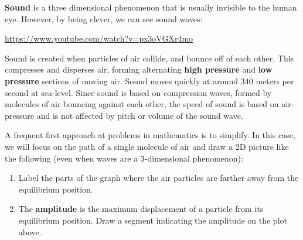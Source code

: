 \documentclass[12pt,noauthor,nooutcomes,hints,handout]{ximera}
\begin{document}
\textbf{Sound} is a three dimensional phenomenon that is usually invisible to the human eye.
However, by being clever, we can see sound waves: 
\begin{center}
\url{https://www.youtube.com/watch?v=px3oVGXr4mo}
\end{center}
Sound is created when particles of air collide, and bounce off of each other. This  compresses and disperses air, forming alternating \textbf{high pressure} and \textbf{low pressure} sections of moving air. Sound moves quickly at around $340$ meters per second at sea-level. Since sound is based on compression waves, formed by molecules of air bouncing against each other, the speed of sound is based on air-pressure and is not affected by pitch or volume of the sound wave.


\begin{question}
A frequent first approach at problems in mathematics is to simplify. In this case, we will focus on the path of a single molecule of air and draw a 2D picture like the following (even when waves are a 3-dimensional phenomenon):
\begin{center}
\end{center}
\begin{enumerate}
\item Label the parts of the graph where the air particles are farther away from the equilibrium position.
\item The \textbf{amplitude} is the maximum displacement of a particle from its equilibrium position. Draw a segment indicating the amplitude on the plot above. 
\end{enumerate}
\end{question}
\end{document}

